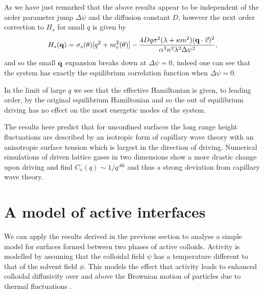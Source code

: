 As we have just remarked  that the above results appear to be independent of the order parameter jump $\Delta \psi$ and the diffusion constant $D$, however the next order correction to $H_s$ for small $q$ is given by
\begin{equation}
H_s({\bf q}) = \sigma_s(\theta) [q^2 + m^2_e(\theta)] - \frac{4Dq \sigma^2(\lambda+\kappa m^2)( {\bf q}\cdot\vec{v})^2 }{\alpha^3 \kappa^2 \lambda^2 \Delta\psi^2},
\end{equation}
and so the small ${\bf q}$ expansion  breaks down at $\Delta\psi=0$, indeed one can see that the system has exactly the equilibrium correlation function when  $\Delta\psi=0$. 

In the limit of large $q$ we see that the effective Hamiltonian is given, to leading order, by the original equilibrium Hamiltonian and so the out of equilibrium driving has no effect on the most energetic modes of the system.

The results here predict that for unconfined surfaces the long range height fluctuations are described by an isotropic form of capillary wave theory with 
an anisotropic surface tension which is largest in the direction of driving. Numerical simulations of driven lattice gases in two dimensions \cite{leun1993} show a more drastic change upon driving and find $C_s(q)\sim  1/q^{.66}$ and thus a strong deviation from capillary wave theory.  
\section{A model of active interfaces}
We can apply the results derived in the previous section to analyse a simple model for
surfaces formed between two phases of active colloids. Activity is modelled by assuming that the colloidal field $\psi$ has a temperature different to that of  the solvent field $\phi$. This models the effect that activity leads to enhanced colloidal diffusivity over and
above the Brownian motion of particles due to thermal fluctuations \cite{gros2015}.

